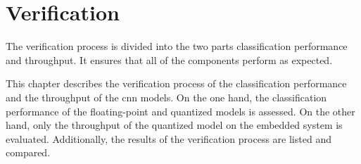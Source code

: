 \chapter{Verification}
\label{ch:verification_and_benchmark}

The verification process is divided into the two parts classification performance and throughput.
It ensures that all of the components perform as expected.

This chapter describes the verification process of the classification performance and the throughput of the \acrshort{cnn} models.
On the one hand, the classification performance of the floating-point and quantized models is assessed.
On the other hand, only the throughput of the quantized model on the embedded system is evaluated.
Additionally, the results of the verification process are listed and compared.



